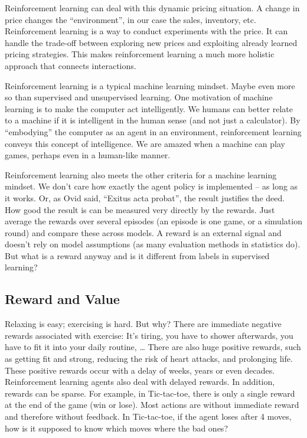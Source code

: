 \documentclass[
  10pt,
]{scrbook}
\begin{document}
Reinforcement learning can deal with this dynamic pricing situation.
A change in price changes the ``environment'', in our case the sales, inventory, etc.
Reinforcement learning is a way to conduct experiments with the price.
It can handle the trade-off between exploring new prices and exploiting already learned pricing strategies.
This makes reinforcement learning a much more holistic approach that connects interactions.

Reinforcement learning is a typical machine learning mindset.
Maybe even more so than supervised and unsupervised learning.
One motivation of machine learning is to make the computer act intelligently.
We humans can better relate to a machine if it is intelligent in the human sense (and not just a calculator).
By ``embodying'' the computer as an agent in an environment, reinforcement learning conveys this concept of intelligence.
We are amazed when a machine can play games, perhaps even in a human-like manner.

Reinforcement learning also meets the other criteria for a machine learning mindset.
We don't care how exactly the agent policy is implemented -- as long as it works.
Or, as Ovid said, ``Exitus acta probat'', the result justifies the deed.
How good the result is can be measured very directly by the rewards.
Just average the rewards over several episodes (an episode is one game, or a simulation round) and compare these across models.
A reward is an external signal and doesn't rely on model assumptions (as many evaluation methods in statistics do).
But what is a reward anyway and is it different from labels in supervised learning?

\hypertarget{reward-and-value}{%
\subsection{Reward and Value}\label{reward-and-value}}

Relaxing is easy; exercising is hard.
But why?
There are immediate negative rewards associated with exercise:
It's tiring, you have to shower afterwards, you have to fit it into your daily routine, \ldots{}
There are also huge positive rewards, such as getting fit and strong, reducing the risk of heart attacks, and prolonging life.
These positive rewards occur with a delay of weeks, years or even decades.
Reinforcement learning agents also deal with delayed rewards.
In addition, rewards can be sparse.
For example, in Tic-tac-toe, there is only a single reward at the end of the game (win or lose).
Most actions are without immediate reward and therefore without feedback.
In Tic-tac-toe, if the agent loses after 4 moves, how is it supposed to know which moves where the bad ones?
\end{document}
